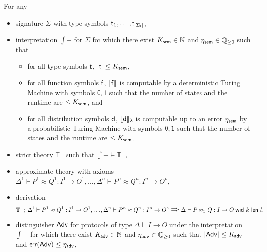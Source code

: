 
\begin{lemma}\label{lem:soundness_equality_approximate}
For any
\begin{itemize}
\item \ipdl signature $\Sigma$ with type symbols $\mathsf{t}_1,\ldots,\mathsf{t}_{|\Sigma_\mathsf{t}|}$,

\item interpretation $\int{-}$ for $\Sigma$ for which there exist $K_{\mathsf{sem}} \in \mathbb{N}$ and $\eta_{\mathsf{sem}} \in \mathbb{Q}_{\geq 0}$ such that
\begin{itemize}
\item for all type symbols $\mathsf{t}$, $|\mathsf{t}| \leq K_{\mathsf{sem}}$,

\item for all function symbols $\mathsf{f}$, $\llbracket \mathsf{f} \rrbracket$ is computable by a deterministic Turing Machine with symbols $\mathsf{0}, \mathsf{1}$ such that the number of states and the runtime are $\leq K_{\mathsf{sem}}$, and

\item for all distribution symbols $\mathsf{d}$, $\llbracket \mathsf{d} \rrbracket_\lambda$ is computable up to an error $\eta_{\mathsf{sem}}$ by a probabilistic Turing Machine with symbols $\mathsf{0}, \mathsf{1}$ such that the number of states and the runtime are $\leq K_{\mathsf{sem}}$,
\end{itemize}

\item strict \ipdl theory $\mathbb{T}_=$ such that $\int{-} \vDash \mathbb{T}_=$,

\item approximate \ipdl theory with axioms $\Delta^1 \vdash P^1 \approx Q^1 : I^1 \to O^1, \ldots, \Delta^n \vdash P^n \approx Q^n : I^n \to O^n$,

\item derivation \[\mathbb{T}_=; \, \Delta^1 \vdash P^1 \approx Q^1 : I^1 \to O^1, \ldots, \Delta^n \vdash P^n \approx Q^n : I^n \to O^n \; \mathlarger{\mathlarger{\Rightarrow}} \; \Delta \vdash \lapproxeq{P}{Q}{I}{O}{k}{l}{5},\]%

\item distinguisher $\mathsf{Adv}$ for protocols of type $\Delta \vdash I \to O$ under the interpretation $\int{-}$ for which there exist $K_{\mathsf{adv}} \in \mathbb{N}$ and $\eta_{\mathsf{adv}} \in \mathbb{Q}_{\geq 0}$ such that $|\mathsf{Adv}| \leq K_{\mathsf{adv}}$ and $\mathsf{err}(\mathsf{Adv}) \leq \eta_{\mathsf{adv}}$,


\end{itemize}
\end{lemma}

